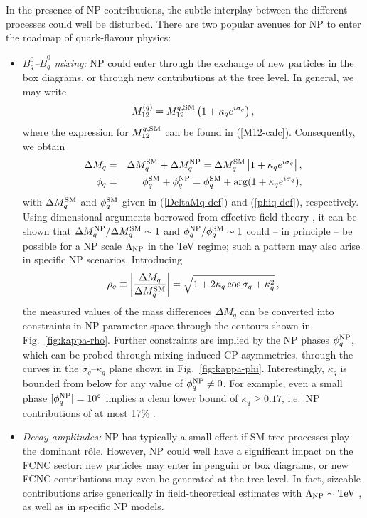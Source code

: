 \documentclass[12pt]{article}
\begin{document}
In the presence of NP contributions, the subtle interplay between the different 
processes could well be disturbed. There are two popular avenues for NP to 
enter the roadmap of quark-flavour physics:
\begin{itemize}
\item {\it $B^0_q$--$\bar B^0_q$ mixing:} NP could enter through the exchange
of new particles in the box diagrams, or through new contributions at the
tree level. In general, we may write
\begin{equation}%
M_{12}^{(q)} =M_{12}^{q,{\rm SM}} \left(1 + \kappa_q e^{i\sigma_q}\right),
\end{equation}
where the expression for $M_{12}^{q,{\rm SM}}$ can be found 
in (\ref{M12-calc}). Consequently, we obtain
\begin{eqnarray}
\Delta M_q & = &\Delta M_q^{\rm SM}+\Delta M_q^{\rm NP} =
\Delta M_q^{\rm SM}\left| 1 + \kappa_q
  e^{i\sigma_q}\right|,\label{DMq-NP}\\
\phi_q & = & \phi_q^{\rm SM}+\phi_q^{\rm NP}=
\phi_q^{\rm SM} + \arg (1+\kappa_q e^{i\sigma_q}),\label{phiq-NP}
\end{eqnarray}
with $\Delta M_q^{\rm SM}$ and $\phi_q^{\rm SM}$ given in (\ref{DeltaMq-def}) and
(\ref{phiq-def}), respectively. 
Using dimensional arguments borrowed from effective field 
theory \cite{FM-BpsiK,FIM}, it can be shown that 
$\Delta M_q^{\rm NP}/\Delta M_q^{\rm SM}\sim1$ and
$\phi_q^{\rm NP}/\phi_q^{\rm SM}\sim1$ could -- in principle -- be possible
for a NP scale $\Lambda_{\rm NP}$ in the TeV regime; such a pattern may 
also arise in specific NP scenarios. Introducing 
\begin{equation}\label{rhoq-def}
\rho_q\equiv
\left|\frac{\Delta M_q}{\Delta M_q^{\rm SM}}\right|=
\sqrt{1+2\kappa_q\cos\sigma_q+\kappa_q^2}\,,
\end{equation}
the measured values of the mass differences $\Delta M_q$ can be converted
into constraints in NP parameter space through the contours shown in
Fig.~\ref{fig:kappa-rho}. Further constraints are implied by the NP
phases $\phi_q^{\rm NP}$, which can be probed through mixing-induced
CP asymmetries, through the curves in the $\sigma_q$--$\kappa_q$
plane shown in Fig.~\ref{fig:kappa-phi}. Interestingly, $\kappa_q$ is bounded
from below for any value of $\phi_q^{\rm NP}\not=0$. For example, even a
small phase $|\phi_q^{\rm NP}|=10^\circ$ implies a clean lower bound of
$\kappa_q\geq0.17$, i.e.\ NP contributions of at most 17\% \cite{BF-DMs}. 
\item {\it Decay amplitudes:} NP has typically a small effect if SM tree processes
play the dominant r\^ole. However, NP could well have a significant impact on 
the FCNC sector: new particles may enter in penguin or box diagrams, or new 
FCNC contributions may even be generated at the tree level. In fact, sizeable 
contributions arise generically in field-theoretical estimates with 
$\Lambda_{\rm NP}\sim\mbox{TeV}$ \cite{FM-BphiK}, as well as in specific 
NP models. 
\end{itemize}
\end{document}
